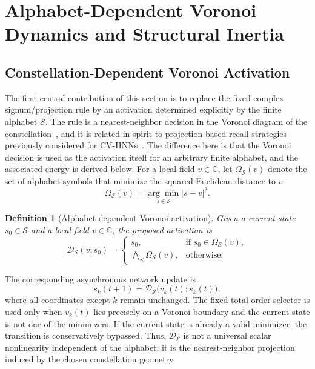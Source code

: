 \documentclass[10pt,journal,letterpaper]{IEEEtran}
\newtheorem{definition}{Definition}
\begin{document}
\section{Alphabet-Dependent Voronoi Dynamics and Structural Inertia}
\label{sec:voronoi}

\subsection{Constellation-Dependent Voronoi Activation}

The first central contribution of this section is to replace the fixed
complex signum/projection rule by an activation determined explicitly by the
finite alphabet $\mathcal{S}$. The rule is a nearest-neighbor decision in the
Voronoi diagram of the constellation~\cite{aurenhammer2013voronoi}, and it is
related in spirit to projection-based recall strategies previously considered
for CV-HNNs~\cite{lee2001,kobayashi2017fastrecall}.
The difference here is that the Voronoi decision is used as the activation
itself for an arbitrary finite alphabet, and the associated energy is derived
below. For a local field $v\in\mathbb{C}$, let
$\Omega_{\mathcal{S}}(v)$ denote the set of alphabet symbols that minimize the
squared Euclidean distance to $v$:
\begin{equation}
    \Omega_{\mathcal{S}}(v)
    = \underset{s \in \mathcal{S}}{\arg\min} |s - v|^2.
\label{eq:voronoi_minimizers}
\end{equation}

\begin{definition}[Alphabet-dependent Voronoi activation]
Given a current state $s_0\in\mathcal{S}$ and a local field $v\in\mathbb{C}$,
the proposed activation is
\begin{equation}
    \mathcal{D}_{\mathcal{S}}(v;s_0)
    =
    \begin{cases}
    s_0, & \text{if } s_0\in\Omega_{\mathcal{S}}(v),\\
    \bigwedge_{\preceq}\Omega_{\mathcal{S}}(v), & \text{otherwise}.
    \end{cases}
\label{eq:voronoi_activation}
\end{equation}
\end{definition}

The corresponding asynchronous network update is
\begin{equation}
    s_k(t+1)
    = \mathcal{D}_{\mathcal{S}}\bigl(v_k(t);s_k(t)\bigr),
\label{eq:voronoi_rule}
\end{equation}
where all coordinates except $k$ remain unchanged. The fixed total-order
selector is used only when $v_k(t)$ lies precisely on a Voronoi boundary and
the current state is not one of the minimizers. If the current state is already
a valid minimizer, the transition is conservatively bypassed. Thus,
$\mathcal{D}_{\mathcal{S}}$ is not a universal scalar nonlinearity independent
of the alphabet; it is the nearest-neighbor projection induced by the chosen
constellation geometry.
\end{document}
